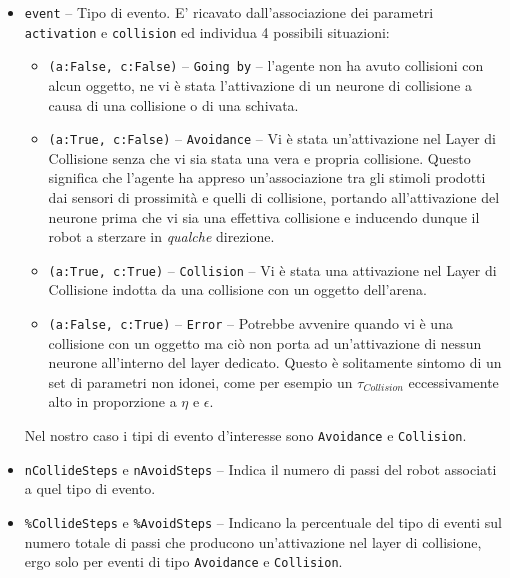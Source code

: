 \begin{itemize}
    \item \texttt{event} -- Tipo di evento. E' ricavato dall'associazione dei parametri \texttt{activation} e \texttt{collision} ed individua 4 possibili situazioni:
        \begin{itemize}
            \item \texttt{(a:False, c:False)} -- \texttt{Going by} -- l'agente non ha avuto collisioni con alcun oggetto, ne vi è stata l'attivazione di un neurone di collisione a causa di una collisione o di una schivata.
            
            \item \texttt{(a:True, c:False)} -- \texttt{Avoidance} -- Vi è stata un'attivazione nel Layer di Collisione senza che vi sia stata una vera e propria collisione. Questo significa che l'agente ha appreso un'associazione tra gli stimoli prodotti dai sensori di prossimità e quelli di collisione, portando all'attivazione del neurone prima che vi sia una effettiva collisione e inducendo dunque il robot a sterzare in \textit{qualche} direzione.
            
            \item \texttt{(a:True, c:True)} -- \texttt{Collision} -- Vi è stata una attivazione nel Layer di Collisione indotta da una collisione con un oggetto dell'arena.
            
            \item \texttt{(a:False, c:True)} -- \texttt{Error} -- Potrebbe avvenire quando vi è una collisione con un oggetto ma ciò non porta ad un'attivazione di nessun neurone all'interno del layer dedicato. Questo è solitamente sintomo di un set di parametri non idonei, come per esempio un $\tau_{Collision}$ eccessivamente alto in proporzione a $\eta$ e $\epsilon$.
        \end{itemize}
    
    Nel nostro caso i tipi di evento d'interesse sono \texttt{Avoidance} e \texttt{Collision}.
        
    \item \texttt{nCollideSteps} e \texttt{nAvoidSteps} -- Indica il numero di passi del robot associati a quel tipo di evento.
    
    \item \texttt{\%CollideSteps} e \texttt{\%AvoidSteps} -- Indicano la percentuale del tipo di eventi sul numero totale di passi che producono un'attivazione nel layer di collisione, ergo solo per eventi di tipo \texttt{Avoidance} e \texttt{Collision}. 
    

\end{itemize}
